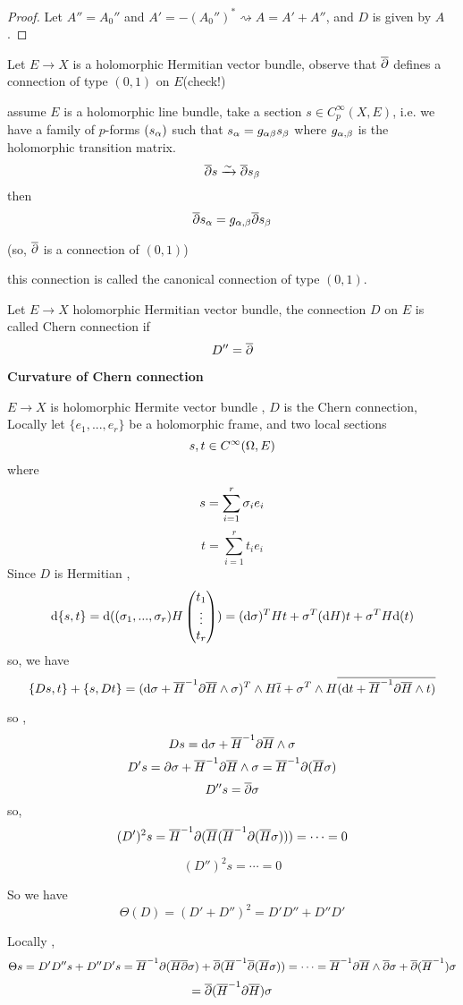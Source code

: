 \begin{proof}
Let $A''=A_0''$ and $A'=-(A_0'')^*\rightsquigarrow A=A'+A''$, and
$D$ is given by $A$.
\end{proof}

Let $E\to X$ is a holomorphic Hermitian vector bundle,
observe that $\overline{\partial}$ defines a connection of type $(0,1)$ on $E$(check!)

assume $E$ is a holomorphic line bundle, take a section
$s\in C_p^\infty(X,E)$, i.e. we have a family of $p$-forms $(s_\alpha)$
such that $s_\alpha=g_{\alpha\beta}s_\beta$
where $g_{\alpha,\beta}$ is the holomorphic transition matrix.
$$\overline{\partial} s\xrightarrow{\sim}\overline{\partial} s_\beta$$
then
$$\overline{\partial} s_\alpha=g_{\alpha,\beta}\overline{\partial} s_\beta$$

(so, $\overline{\partial}$ is a connection of $(0,1)$)

this connection is called the canonical connection of type $(0,1)$.

\begin{definition}
Let $E\to X$ holomorphic Hermitian vector bundle,
the connection $D$ on $E$ is called Chern connection if
$$D''=\overline{\partial}$$
\end{definition}

\textbf{Curvature of Chern connection}

$E\to X$ is holomorphic Hermite vector bundle , $D$ is the Chern connection,
Locally let $\{e_1,...,e_r\}$ be a holomorphic frame, and two local sections
$$s,t\in C^\infty(\Omega, E)$$
where
$$s=\sum_{i=1}^r\sigma_ie_i$$
$$t=\sum_{i=1}^r t_ie_i$$
Since $D$ is Hermitian ,
$$\mathrm{d} \{s,t\}=\mathrm{d} ((\sigma_1,...,\sigma_r)H
\begin{pmatrix}
t_1\\
\vdots\\
t_r
\end{pmatrix})
=(\mathrm{d}\sigma)^THt+\sigma^T(\mathrm{d} H)t+\sigma^TH\mathrm{d}(t)
$$
so, we have
$$\{Ds,t\}+\{s,Dt\}=(\mathrm{d}\sigma+\overline{H}^{-1}\partial\overline{H}\wedge\sigma)^T\wedge H\overline{t}
+\sigma^T\wedge H\overline{(\mathrm{d} t+\overline{H}^{-1}\partial\overline{H}\wedge t)}$$

so ,
$$Ds=\mathrm{d}\sigma+\overline{H}^{-1}\partial\overline{H}\wedge\sigma$$
$$D's=\partial\sigma+\overline{H}^{-1}\partial\overline{H}\wedge\sigma
=\overline{H}^{-1}\partial(\overline{H}\sigma)$$
$$D''s=\overline{\partial}\sigma$$
so,
$$(D')^2s=\overline{H}^{-1}\partial(\overline{H}(\overline{H}^{-1}\partial(\overline{H}\sigma)))
=\cdots=0$$

$$(D'')^2s=\cdots=0$$

So we have
$$\Theta(D)=(D'+D'')^2=D'D''+D''D'$$

Locally ,
$$\Theta s=D'D''s+D''D's=\overline{H}^{-1}\partial(\overline{H}\overline{\partial}\sigma)
+\overline{\partial}(\overline{H}^{-1}\overline{\partial}(\overline{H}\sigma))
=\cdots=\overline{H}^{-1}\partial\overline{H}\wedge\overline{\partial}\sigma
+\overline{\partial}(\overline{H}^{-1})\sigma
$$
$$
  = \overline{\partial}(\overline{H}^{-1}\partial\overline{H})\sigma
$$

